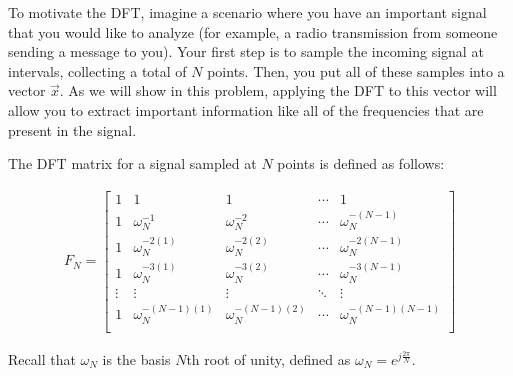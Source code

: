 

To motivate the DFT, imagine a scenario where you have an important signal that you would
like to analyze (for example, a radio transmission from someone sending a message to you).
Your first step is to sample the incoming signal at intervals, collecting a total of $N$
points. Then, you put all of these samples into a vector $\vec{x}$. As we will show in this
problem, applying the DFT to this vector will allow you to extract important information like
all of the frequencies that are present in the signal.

The DFT matrix for a signal sampled at $N$ points is defined as follows:

\begin{align*}
F_N = 
\begin{bmatrix}
1 & 1 & 1 & \cdots & 1 \\
1 & \omega_N^{-1} & \omega_N^{-2} & \cdots & \omega_N^{-(N-1)} \\
1 & \omega_N^{-2(1)} & \omega_N^{-2(2)} & \cdots & \omega_N^{-2(N-1)} \\
1 & \omega_N^{-3(1)} & \omega_N^{-3(2)} & \cdots & \omega_N^{-3(N-1)} \\
\vdots & \vdots & \vdots  & \ddots & \vdots \\
1 & \omega_N^{-(N-1)(1)} & \omega_N^{-(N-1)(2)} & \cdots & \omega_N^{-(N-1)(N-1)} \\
\end{bmatrix} 
\end{align*}

Recall that $\omega_N$ is the basis $N$th root of unity, defined as $\omega_N = e^{j\frac{2\pi}{N}}$.

